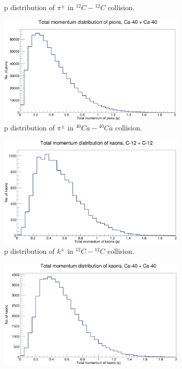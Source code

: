 \documentclass[12pt, twocolumn]{article}
\begin{document}
\begin{figure}[h]
\begin{subfigure}[h]{0.49\textwidth}
\caption{p distribution of $\pi^{\pm}$ in $^{12}C-{^{12}C}$ collision.}
\label{Generator - Total momentum distribution of pions C12.}
\end{subfigure}
\hfill
\vspace*{1cm}
\begin{subfigure}[h]{0.49\textwidth}
\centering
\includegraphics[scale=0.14]{pToT_pions_Ca.png}
\caption{p distribution of $\pi^{\pm}$ in $^{40}Ca-{^{40}Ca}$ collision.}
\label{Generator - Total momentum distribution of pions Ca40.}
\end{subfigure}
\hfill
\begin{subfigure}[h]{0.49\textwidth}
\centering
\includegraphics[scale=0.14]{pToT_kaons_C12.png}
\caption{p distribution of $k^{\pm}$ in $^{12}C-{^{12}C}$ collision.}
\label{Generator - Total momentum distribution of kaons C12.}
\end{subfigure}
\hfill
\begin{subfigure}[h]{0.49\textwidth}
\centering
\includegraphics[scale=0.14]{pToT_kaons_Ca.png}

\end{subfigure}
\end{figure}
\end{document}
